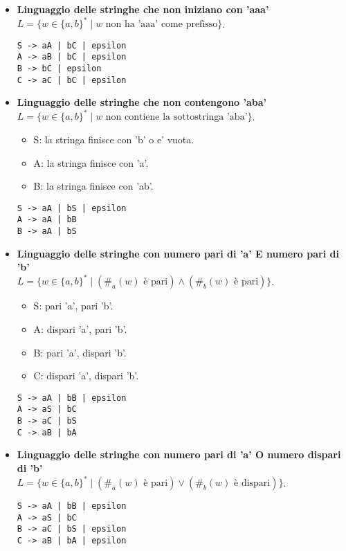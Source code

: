 \begin{itemize}
    \item \textbf{Linguaggio delle stringhe che non iniziano con 'aaa'} \\
    $L = \{w \in \{a,b\}^* \mid w \text{ non ha 'aaa' come prefisso}\}$.
    \begin{Verbatim}[frame=single]
S -> aA | bC | epsilon
A -> aB | bC | epsilon
B -> bC | epsilon
C -> aC | bC | epsilon
    \end{Verbatim}

    \item \textbf{Linguaggio delle stringhe che non contengono 'aba'} \\
     $L = \{w \in \{a,b\}^* \mid w \text{ non contiene la sottostringa 'aba'}\}$.
    \begin{itemize}
        \item S: la stringa finisce con 'b' o e' vuota.
        \item A: la stringa finisce con 'a'.
        \item B: la stringa finisce con 'ab'.
    \end{itemize}
    \begin{Verbatim}[frame=single]
S -> aA | bS | epsilon
A -> aA | bB
B -> aA | bS
    \end{Verbatim}

    \item \textbf{Linguaggio delle stringhe con numero pari di 'a' E numero pari di 'b'} \\
    $L = \{w \in \{a,b\}^* \mid (\#_a(w) \text{ è pari}) \land (\#_b(w) \text{ è pari})\}$.
    \begin{itemize}
        \item S: pari 'a', pari 'b'.
        \item A: dispari 'a', pari 'b'.
        \item B: pari 'a', dispari 'b'.
        \item C: dispari 'a', dispari 'b'.
    \end{itemize}
    \begin{Verbatim}[frame=single]
S -> aA | bB | epsilon
A -> aS | bC
B -> aC | bS
C -> aB | bA
    \end{Verbatim}

    \item \textbf{Linguaggio delle stringhe con numero pari di 'a' O numero dispari di 'b'} \\
    $L = \{w \in \{a,b\}^* \mid (\#_a(w) \text{ è pari}) \lor (\#_b(w) \text{ è dispari})\}$.
    \begin{Verbatim}[frame=single]
S -> aA | bB | epsilon
A -> aS | bC
B -> aC | bS | epsilon
C -> aB | bA | epsilon
    \end{Verbatim}


\end{itemize}
